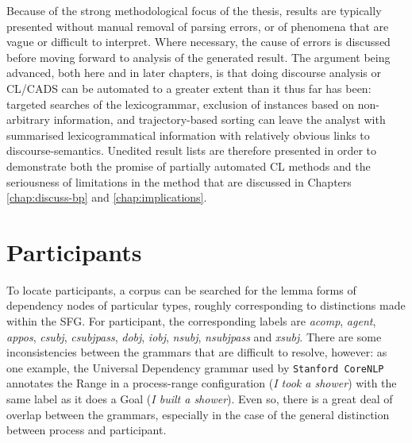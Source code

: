Because of the strong methodological focus of the thesis, results are typically presented without manual removal of parsing errors, or of phenomena that are vague or difficult to interpret. Where necessary, the cause of errors is discussed before moving forward to analysis of the generated result. The argument being advanced, both here and in later chapters, is that doing discourse analysis or \gls{CL}\slash \gls{CADS} can be automated to a greater extent than it thus far has been: targeted searches of the \gls{lexicogrammar}, exclusion of instances based on non\hyp{}arbitrary information, and trajectory\hyp{}based sorting can leave the analyst with summarised lexicogrammatical information with relatively obvious links to \glspl{discourse-semantic}. Unedited result lists are therefore presented in order to demonstrate both the promise of partially automated \gls{CL} methods and the seriousness of limitations in the method that are discussed in Chapters \ref{chap:discuss-bp} and \ref{chap:implications}.

\section{Participants}

To locate participants, a \gls{corpus} can be searched for the lemma forms of dependency nodes of particular types, roughly corresponding to distinctions made within the \gls{SFG}. For participant, the corresponding labels are \emph{acomp}, \emph{agent}, \emph{appos}, \emph{csubj}, \emph{csubjpass}, \emph{dobj}, \emph{iobj}, \emph{nsubj}, \emph{nsubjpass} and \emph{xsubj}. There are some inconsistencies between the grammars that are difficult to resolve, however: as one example, the Universal Dependency grammar used by \texttt{Stanford CoreNLP} annotates the Range in a process\hyp{}range configuration (\emph{I took a shower}) with the same label as it does a Goal (\emph{I built a shower}). Even so, there is a great deal of overlap between the grammars, especially in the case of the general distinction between process and participant.

